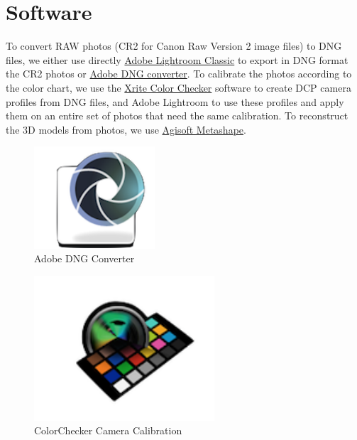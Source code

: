 \documentclass[
]{book}
\theoremstyle{definition}
\theoremstyle{definition}
\theoremstyle{definition}
\theoremstyle{definition}
\theoremstyle{remark}
\begin{document}
\hypertarget{software}{%
\section{Software}\label{software}}

To convert RAW photos (CR2 for Canon Raw Version 2 image files) to DNG
files, we either use directly \href{https://www.adobe.com/ca_fr/products/photoshop-lightroom-classic.html}{Adobe Lightroom
Classic}
to export in DNG format the CR2 photos or \href{https://helpx.adobe.com/camera-raw/using/adobe-dng-converter.html}{Adobe DNG
converter}.
To calibrate the photos according to the color chart, we use the \href{https://xritephoto.com/ph_product_overview.aspx?ID=938\&Action=Support\&SoftwareID=2030}{Xrite
Color
Checker}
software to create DCP camera profiles from DNG files, and Adobe
Lightroom to use these profiles and apply them on an entire set of
photos that need the same calibration. To reconstruct the 3D models from
photos, we use \href{https://www.agisoft.com/downloads/installer/}{Agisoft
Metashape}.

\begin{figure}
\centering
\includegraphics[width=0.4\textwidth,height=\textheight]{Figures/logo Adobe DNG Converter.png}
\caption{Adobe DNG
Converter}
\end{figure}

\begin{figure}
\centering
\includegraphics[width=0.6\textwidth,height=\textheight]{Figures/logo ColorChecker Camera Calibration.png}
\caption{ColorChecker Camera
Calibration}
\end{figure}
\end{document}
